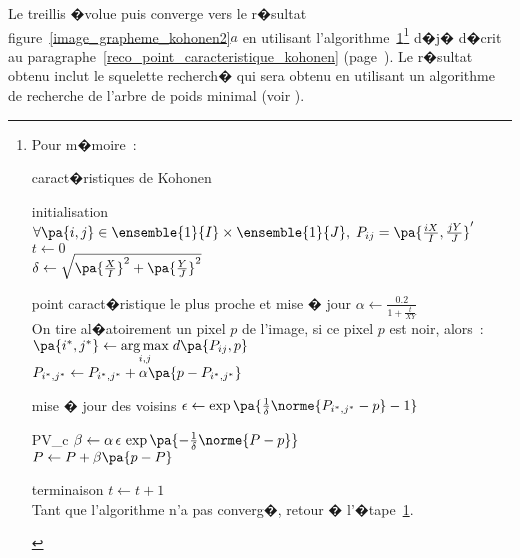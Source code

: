 Le treillis �volue puis converge vers le r�sultat figure~\ref{image_grapheme_kohonen2}$a$ en utilisant l'algorithme~\ref{reco_algo_carac_kohonen_____}\footnote{
Pour m�moire~:
        \begin{xalgorithm}{caract�ristiques de Kohonen}
        \label{reco_algo_carac_kohonen_____}
        
        \begin{xalgostep}{initialisation}
            $\forall \pa{i,j} \in \ensemble{1}{I} \times \ensemble{1}{J}, \; P_{ij} = \pa{ \frac{iX}{I}, \frac{jY}{J} }'$ \\
            $t \leftarrow 0$ \\
            $\delta  \leftarrow \sqrt{ \pa{\frac{X}{I}}^2 + \pa{\frac{Y}{J}}^2 }$
        \end{xalgostep}
        
        \begin{xalgostep}{point caract�ristique le plus proche et mise � jour} \label{reco_algo_carac_kohonen_conv}
            $\alpha \leftarrow \frac{0.2}{1 + \frac{t}{XY} }$ \\
            On tire al�atoirement un pixel $p$ de l'image, si ce pixel $p$ est noir, alors~:\\
            $\pa{i^*,j^*} \leftarrow \underset{i,j} {\arg \max } \; d\pa{P_{ij}, p}$  \\
            $P_{i^*,j^*}     \leftarrow P_{i^*,j^*} + \alpha \pa{ p - P_{i^*,j^*} }$
        \end{xalgostep}
        
        \begin{xalgostep}{mise � jour des voisins} 
            $\epsilon \leftarrow \exp \pa { \frac{1}{\delta}  \norme{P_{i^*,j^*} - p} - 1} $\\
            \begin{xforeach}{P}{V_c} 
                $\beta     \leftarrow \alpha \, \epsilon \, \exp \pa{ - \frac{1}{\delta} \norme{P  - p} } $ \\
                $P             \leftarrow P + \beta \pa{ p - P}$
            \end{xforeach}
        \end{xalgostep}
        
        \begin{xalgostep}{terminaison}
            $t \leftarrow t+1$ \\
            Tant que l'algorithme n'a pas converg�, retour � l'�tape~\ref{reco_algo_carac_kohonen_conv}.
        \end{xalgostep}
        
        
        \end{xalgorithm}
} d�j� d�crit au paragraphe~\ref{reco_point_caracteristique_kohonen} (page~\pageref{reco_point_caracteristique_kohonen}). Le r�sultat obtenu inclut le squelette recherch� qui sera obtenu en utilisant un algorithme de recherche de l'arbre de poids minimal (voir ).


